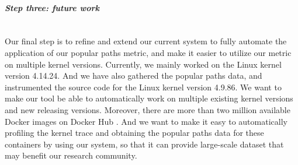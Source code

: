 \paragraph{\textit{\textbf{Step three: future work}}}\mbox{}\\
Our final step is to refine and extend our current system to fully automate the application of our popular paths metric, and make it easier to utilize our metric on multiple kernel versions. 
Currently, we mainly worked on the Linux kernel version 4.14.24. And we have also gathered the popular paths data, and instrumented the source code for the Linux kernel version 4.9.86. 
We want to make our tool be able to automatically work on multiple existing kernel versions and new releasing versions. Moreover, there are more than two million available Docker images 
on Docker Hub \cite{DockerHub}. And we want to make it easy to automatically profiling the kernel trace and obtaining the popular paths data for these containers by using our system, 
so that it can provide large-scale dataset that may benefit our research community. 